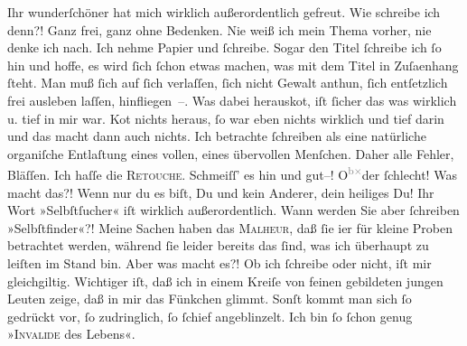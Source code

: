            Ihr wunderſchöner \label{K_L00351_1v}\label{K_L00351_1h} hat mich wirklich
               außerordentlich gefreut. Wie schreibe ich denn?!\pend
           \pstart
           Ganz frei, ganz ohne Bedenken. Nie weiß ich mein Thema vorher, nie denke ich nach.
               Ich nehme Papier und ſchreibe. Sogar den Titel ſchreibe ich ſo hin und hoffe, es wird
               ſich ſchon etwas machen, was mit dem Titel in Zuſa{\geminationm}enhang ſteht.\pend
           \pstart
           Man muß ſich auf ſich verlaſſen, ſich nicht Gewalt anthun, ſich entſetzlich frei
               ausleben laſſen, hinfliegen –. {\pb}Was dabei herausko{\geminationm}t, iſt ſicher das was wirklich u. tief in mir war. Ko{\geminationm}t nichts heraus, ſo war eben nichts wirklich und tief
               darin und das macht dann auch nichts.\pend
           \pstart
           Ich betrachte ſchreiben als eine natürliche organiſche Entlaſtung eines vollen, eines
               übervollen Menſchen.\pend
           \pstart
           Daher alle \strikeout{\textcolor{gray}{meine}} Fehler, Bläſſen. Ich haſſe die \textsc{Retouche}. Schmeiſſ’
               es hin und gut–! O\substVorne{}\textsuperscript{\textcolor{gray}{b}\textcolor{gray}{×}}\substDazwischen{}de\substHinten{}r ſchlecht! Was macht das?! Wenn nur du es biſt, Du und kein Anderer, dein
               heiliges Du! Ihr Wort »Selbſtſucher« iſt wirklich {\pb}außerordentlich. Wann werden Sie aber ſchreiben »Selbſtfinder«?!\pend
           \pstart
            Meine Sachen haben das \textsc{Malheur}, daß ſie i{\geminationm}er für
               kleine Proben betrachtet werden, während ſie leider bereits das ſind, was ich
               überhaupt zu leiſten im Stand bin. Aber was macht es?! Ob ich ſchreibe oder nicht,
               iſt mir gleichgiltig.\pend
           \pstart
           Wichtiger iſt, daß ich in einem Kreiſe von feinen gebildeten jungen Leuten zeige, daß
                   in mir das Fünkchen glimmt. Sonſt kommt man sich ſo gedrückt vor, ſo
               zudringlich, ſo ſchief angeblinzelt. Ich bin ſo ſchon genug »\textsc{Invalide} des Lebens«.\pend
